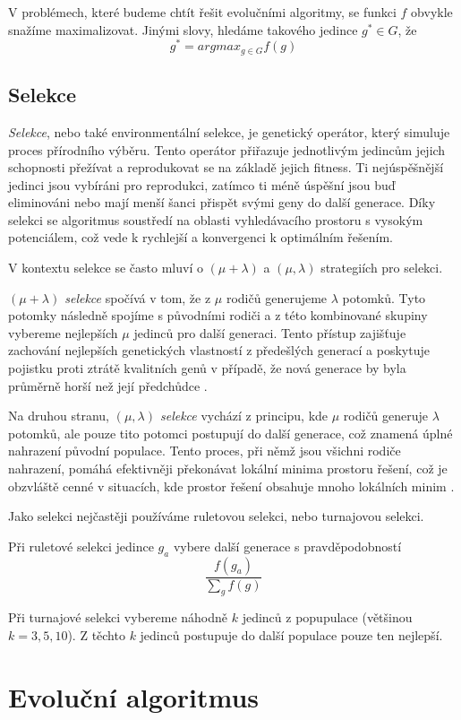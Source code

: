 V problémech, které budeme chtít řešit evolučními algoritmy, se funkci $f$ obvykle snažíme maximalizovat. Jinými slovy, hledáme takového jedince $g^* \in G$, že 
$$g^* = argmax_{g \in G} f(g)$$

\subsection{Selekce}
\emph{Selekce}, nebo také environmentální selekce, je genetický operátor, který simuluje proces přírodního výběru. Tento operátor přiřazuje jednotlivým jedincům jejich schopnosti přežívat a reprodukovat se na základě jejich fitness. Ti nejúspěšnější jedinci jsou vybíráni pro reprodukci, zatímco ti méně úspěšní jsou buď eliminováni nebo mají menší šanci přispět svými geny do další generace. Díky selekci se algoritmus soustředí na oblasti vyhledávacího prostoru s vysokým potenciálem, což vede k rychlejší a konvergenci k optimálním řešením. 

V kontextu selekce se často mluví o $(\mu + \lambda)$ a $(\mu, \lambda)$ strategiích pro selekci. 

\emph{$(\mu + \lambda)$ selekce} spočívá v tom, že z $\mu$ rodičů generujeme $\lambda$ potomků. Tyto potomky následně spojíme s původními rodiči a z této kombinované skupiny vybereme nejlepších $\mu$ jedinců pro další generaci. Tento přístup zajišťuje zachování nejlepších genetických vlastností z předešlých generací a poskytuje pojistku proti ztrátě kvalitních genů v případě, že nová generace by byla průměrně horší než její předchůdce \cite{EibenSmith2015}.

Na druhou stranu, \emph{$(\mu, \lambda)$ selekce} vychází z principu, kde $\mu$ rodičů generuje $\lambda$ potomků, ale pouze tito potomci postupují do další generace, což znamená úplné nahrazení původní populace. Tento proces, při němž jsou všichni rodiče nahrazení, pomáhá efektivněji překonávat lokální minima prostoru řešení, což je obzvláště cenné v situacích, kde prostor řešení obsahuje mnoho lokálních minim \cite{EibenSmith2015}.

Jako selekci nejčastěji používáme ruletovou selekci, nebo turnajovou selekci.

Při ruletové selekci jedince $g_a$ vybere další generace s pravděpodobností
$$\frac{f(g_a)}{\sum_g f(g)}$$

Při turnajové selekci vybereme náhodně $k$ jedinců z popupulace (většinou $k = 3,5,10$). Z těchto $k$ jedinců postupuje do další populace pouze ten nejlepší.

\section{Evoluční algoritmus}

